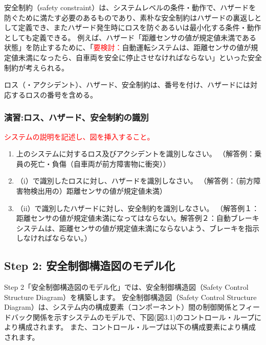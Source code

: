 安全制約（safety constraint）は、システムレベルの条件・動作で、ハザードを防ぐために満たす必要のあるものであり、素朴な安全制約はハザードの裏返しとして定義でき、またハザード発生時にロスを防ぐあるいは最小化する条件・動作としても定義できる。
例えば、ハザード「距離センサの値が規定値未満である状態」を防止するために、「\textcolor{red}{要検討：}自動運転システムは、距離センサの値が規定値未満になったら、自車両を安全に停止させなければならない」といった安全制約が考えられる。

ロス（・アクシデント）、ハザード、安全制約は、番号を付け、ハザードには対応するロスの番号を含める。

\subsubsection{演習:ロス、ハザード、安全制約の識別} %

\textcolor{red}{システムの説明を記述し、図を挿入すること。}

\begin{enumerate}
    \item 上のシステムに対するロス及びアクシデントを識別しなさい。
    （解答例：乗員の死亡・負傷（自車両が前方障害物に衝突））
    \item （i）で識別したロスに対し、ハザードを識別しなさい。
    （解答例：（前方障害物検出用の）距離センサの値が規定値未満）
    \item （ii）で識別したハザードに対し、安全制約を識別しなさい。
    （解答例１：距離センサの値が規定値未満になってはならない。解答例２：自動ブレーキシステムは、距離センサの値が規定値未満にならないよう、ブレーキを指示しなければならない。）
\end{enumerate}

\subsection{Step 2: 安全制御構造図のモデル化}

Step 2「安全制御構造図のモデル化」では、安全制御構造図（Safety Control Structure Diagram）を構築します。
安全制御構造図（Safety Control Structure Diagram）は、システム内の構成要素（コンポーネント）間の制御関係とフィードバック関係を示すシステムのモデルで、下図(図3.1)のコントロール・ループにより構成されます。
また、コントロール・ループは以下の構成要素により構成されます。

